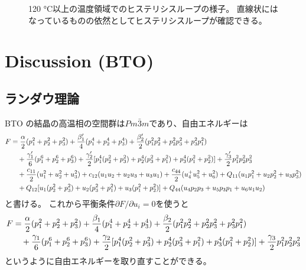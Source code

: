 \documentclass[11pt,dvipdfmx,a4paper]{jsarticle}
\begin{document}
\begin{figure}[H]
\begin{minipage}[t]{0.48\columnwidth}
        \caption{\small{120 \si{\degreeCelsius}以上の温度領域でのヒステリシスループの様子。
        直線状にはなっているものの依然としてヒステリシスループが確認できる。}}
        \label{graph:BTO_D-E_temp_para}
    \end{minipage}
\end{figure}

\section{Discussion (BTO)}
\subsection{ランダウ理論}
BTO の結晶の高温相の空間群は\(Pm\bar{3}m\)であり、自由エネルギーは
\begin{align}
    F
   &= \frac{\alpha}{2}(p_1^2+p_2^2+p_3^2)+\frac{\beta_1'}{4}(p_1^4+p_2^4+p_3^4)+\frac{\beta_2'}{2}(p_1^2p_2^2+p_2^2p_3^2+p_3^2p_1^2) \notag\\
   &\quad +\frac{\gamma'_1}{6}(p_1^6+p_2^6+p_3^6) + \frac{\gamma'_2}{2}[p_1^4(p_2^2+p_3^2)+p_2^4(p_3^2+p_1^2)+p_3^4(p_1^2+p_2^2)] +\frac{\gamma'_3}{2}p_1^2 p_2^2 p_3^2 \notag\\
   &\quad + \frac{c_{11}}{2}(u_1^2+u_2^2+u_3^2)+c_{12}(u_1u_2+u_2u_3+u_3u_1) + \frac{c_{44}}{2}(u_4^+u_5^2+u_6^2) +Q_{11}(u_1p_1^2+u_2p_2^2+u_3p_3^2)\notag\\
   &\quad +Q_{12}[u_1(p_2^2+p_3^2)+u_2(p_3^2+p_1^2)+u_3(p_1^2+p_2^2)]+Q_{44}(u_4p_2p_3+u_5p_3p_1+u_6u_1u_2)
\end{align}
と書ける\cite{ishibashi}。
これから平衡条件\(\partial F/ \partial u_i = 0\)を使うと
\begin{align}
    F
   &= \frac{\alpha}{2}(p_1^2+p_2^2+p_3^2)+\frac{\beta_1}{4}(p_1^4+p_2^4+p_3^4)+\frac{\beta_2}{2}(p_1^2p_2^2+p_2^2p_3^2+p_3^2p_1^2) \notag\\
   &\quad +\frac{\gamma_1}{6}(p_1^6+p_2^6+p_3^6) + \frac{\gamma_2}{2}[p_1^4(p_2^2+p_3^2)+p_2^4(p_3^2+p_1^2)+p_3^4(p_1^2+p_2^2)] +\frac{\gamma_3}{2}p_1^2 p_2^2 p_3^2
\end{align}
というように自由エネルギーを取り直すことができる。
\end{document}
